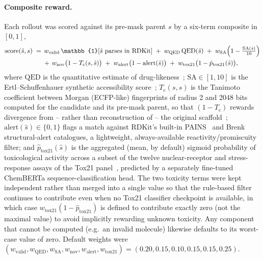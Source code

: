 \paragraph{Composite reward.}
Each rollout was scored against its pre-mask parent $s$ by a six-term
composite in $[0,1]$,
\begin{align}
\mathrm{score}(\hat{s}, s) \;=\;
  &\,w_{\mathrm{valid}}\,\mathbb{1}[\hat{s}\ \mathrm{parses\ in\ RDKit}]
  \;+\; w_{\mathrm{QED}}\,\mathrm{QED}(\hat{s})
  \;+\; w_{\mathrm{SA}}\Bigl(1-\tfrac{\mathrm{SA}(\hat{s})}{10}\Bigr) \notag \\
  &+\, w_{\mathrm{nov}}\bigl(1-T_{\mathrm{c}}(s,\hat{s})\bigr)
  \;+\; w_{\mathrm{alert}}\bigl(1-\mathrm{alert}(\hat{s})\bigr)
  \;+\; w_{\mathrm{tox21}}\bigl(1-\hat{p}_{\mathrm{tox21}}(\hat{s})\bigr),
\label{eq:stage9-score}
\end{align}
where $\mathrm{QED}$ is the quantitative estimate of
drug-likeness~\cite{bickerton2012qed}; $\mathrm{SA}\in[1,10]$ is the
Ertl--Schuffenhauer synthetic accessibility
score~\cite{ertl2009sascore}; $T_{\mathrm{c}}(s,\hat{s})$ is the Tanimoto
coefficient between Morgan (ECFP-like) fingerprints of radius 2 and 2048 bits
computed for the candidate and its pre-mask parent, so that
$(1-T_{\mathrm{c}})$ rewards divergence from -- rather than reconstruction of
-- the original scaffold~\cite{rogers2010ecfp}; $\mathrm{alert}(\hat{s})\in\{0,1\}$
flags a match against RDKit's built-in PAINS~\cite{baell2010pains} and
Brenk~\cite{brenk2008alerts} structural-alert catalogues, a lightweight,
always-available reactivity/promiscuity filter; and
$\hat{p}_{\mathrm{tox21}}(\hat{s})$ is the aggregated (mean, by default)
sigmoid probability of toxicological activity across a subset of the twelve
nuclear-receptor and stress-response assays of the Tox21
panel~\cite{huang2016tox21,tox21challenge}, predicted by a separately
fine-tuned ChemBERTa sequence-classification head. The two toxicity terms
were kept independent rather than merged into a single value so that the
rule-based filter continues to contribute even when no Tox21 classifier
checkpoint is available, in which case $w_{\mathrm{tox21}}(1-\hat p_{\mathrm{tox21}})$
is defined to contribute exactly zero (not the maximal value) to avoid
implicitly rewarding unknown toxicity. Any component that cannot be computed
(e.g.\ an invalid molecule) likewise defaults to its worst-case value of
zero. Default weights were
$(w_{\mathrm{valid}}, w_{\mathrm{QED}}, w_{\mathrm{SA}}, w_{\mathrm{nov}},
w_{\mathrm{alert}}, w_{\mathrm{tox21}}) = (0.20, 0.15, 0.10, 0.15, 0.15,
0.25)$.

